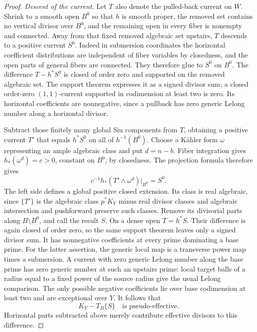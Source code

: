 \documentclass[11pt,letterpaper]{article}
\theoremstyle{definition}
\theoremstyle{remark}
\begin{document}
\begin{proof}
 
 \emph{Descent of the current.}
Let \(T\) also denote the pulled-back current on \(W\).
Shrink to a smooth open \(B^0\) so that \(h\) is smooth
proper, the removed set contains no vertical divisor
over \(B^0\), and the remaining open in every fiber is
nonempty and connected. Away from that fixed removed
algebraic set upstairs, \(T\) descends to a positive current
\(S^0\).
Indeed in submersion coordinates the horizontal coefficient
distributions are independent of fiber variables by closedness,
and the open parts of general fibers are connected. They
therefore glue to \(S^0\) on \(B^0\). The difference
\(T-h^*S^0\) is closed of order zero and supported on the
removed algebraic set. The support theorem expresses it as a
signed divisor sum; a closed order-zero \((1,1)\)-current
supported in codimension at least two is zero. Its horizontal coefficients are
nonnegative, since a pullback has zero generic Lelong number
along a horizontal divisor.

Subtract those finitely many global Siu components from
\(T\), obtaining a positive current \(T'\) that equals
\(h^*S^0\) on all of \(h^{-1}(B^0)\). Choose a K\"ahler form
\(\omega\) representing an ample algebraic class and put
\(d=n-b\). Fiber integration gives
\(h_*(\omega^d)=c>0\), constant on \(B^0\), by closedness.
The projection formula therefore gives
\[
 c^{-1}h_*(T'\wedge\omega^d)|_{B^0}=S^0.
\]
The left side defines a global positive closed extension.
Its class is real algebraic, since \(\{T'\}\) is the
algebraic class \(p^*K_Y\) minus real divisor classes and
algebraic intersection and pushforward preserve such
classes. Remove its divisorial parts along
\(B\setminus B^0\), and call the result \(S\).
On a dense open \(T=h^*S\). Their difference is again closed
of order zero, so the same support theorem leaves only a
signed divisor sum. It has nonnegative coefficients at every
prime dominating a base prime. For the latter assertion, the
generic local map is a transverse power map times a
submersion. A current with zero generic Lelong number along
the base prime has zero generic number at such an upstairs
prime: local target balls of a radius equal to a fixed power
of the source radius give the usual Lelong comparison.
The only possible negative coefficients lie over base
codimension at least two and are exceptional over \(Y\).
It follows that
\begin{equation}\label{proj:ex:descent-domination}
 K_Y-T_B\{S\}\quad\text{is pseudo-effective}.
\end{equation}
Horizontal parts subtracted above merely contribute effective
divisors to this difference.


\end{proof}
\end{document}
